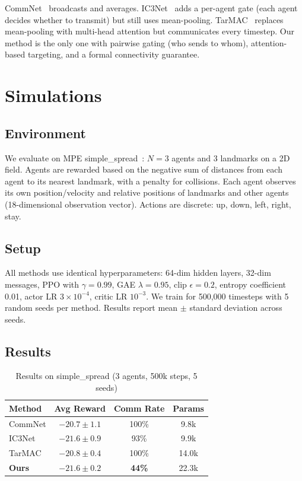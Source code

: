 \documentclass[letterpaper, 10 pt, journal, twoside]{IEEEtran}
\begin{document}
CommNet~\cite{Sukhbaatar2016} broadcasts and averages. IC3Net~\cite{Singh2019} adds a per-agent gate (each agent decides whether to transmit) but still uses mean-pooling. TarMAC~\cite{Das2019} replaces mean-pooling with multi-head attention but communicates every timestep. Our method is the only one with pairwise gating (who sends to whom), attention-based targeting, and a formal connectivity guarantee.

\section{Simulations}

\subsection{Environment}

We evaluate on MPE simple\_spread~\cite{Lowe2017}: $N=3$ agents and 3 landmarks on a 2D field. Agents are rewarded based on the negative sum of distances from each agent to its nearest landmark, with a penalty for collisions. Each agent observes its own position/velocity and relative positions of landmarks and other agents (18-dimensional observation vector). Actions are discrete: up, down, left, right, stay.

\subsection{Setup}

All methods use identical hyperparameters: 64-dim hidden layers, 32-dim messages, PPO with $\gamma = 0.99$, GAE $\lambda = 0.95$, clip $\epsilon = 0.2$, entropy coefficient 0.01, actor LR $3 \times 10^{-4}$, critic LR $10^{-3}$. We train for 500,000 timesteps with 5 random seeds per method. Results report mean $\pm$ standard deviation across seeds.

\subsection{Results}

\begin{table}[h]
\centering
\caption{Results on simple\_spread (3 agents, 500k steps, 5 seeds)}
\label{tab:results}
\begin{tabular}{lccc}
\toprule
\textbf{Method} & \textbf{Avg Reward} & \textbf{Comm Rate} & \textbf{Params} \\
\midrule
CommNet & $-20.7 \pm 1.1$ & 100\% & 9.8k \\
IC3Net & $-21.6 \pm 0.9$ & 93\% & 9.9k \\
TarMAC & $-20.8 \pm 0.4$ & 100\% & 14.0k \\
\textbf{Ours} & $-21.6 \pm 0.2$ & \textbf{44\%} & 22.3k \\
\bottomrule
\end{tabular}
\end{table}
\end{document}
